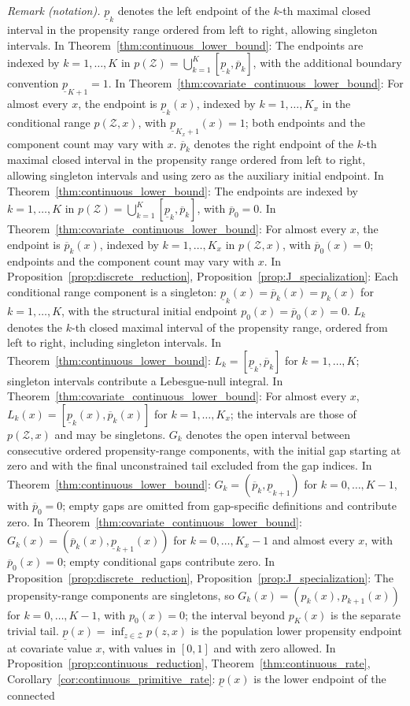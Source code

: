 \noindent\textit{Remark (notation).} $\underline p_k$ denotes the left endpoint of the $k$-th maximal closed interval in the propensity range ordered from left to right, allowing singleton intervals. In Theorem~\ref{thm:continuous_lower_bound}: The endpoints are indexed by $k=1,\ldots,K$ in $p(\mathcal Z)=\bigcup_{k=1}^K[\underline p_k,\overline p_k]$, with the additional boundary convention $\underline p_{K+1}=1$. In Theorem~\ref{thm:covariate_continuous_lower_bound}: For almost every $x$, the endpoint is $\underline p_k(x)$, indexed by $k=1,\ldots,K_x$ in the conditional range $p(\mathcal Z,x)$, with $\underline p_{K_x+1}(x)=1$; both endpoints and the component count may vary with $x$. $\overline p_k$ denotes the right endpoint of the $k$-th maximal closed interval in the propensity range ordered from left to right, allowing singleton intervals and using zero as the auxiliary initial endpoint. In Theorem~\ref{thm:continuous_lower_bound}: The endpoints are indexed by $k=1,\ldots,K$ in $p(\mathcal Z)=\bigcup_{k=1}^K[\underline p_k,\overline p_k]$, with $\overline p_0=0$. In Theorem~\ref{thm:covariate_continuous_lower_bound}: For almost every $x$, the endpoint is $\overline p_k(x)$, indexed by $k=1,\ldots,K_x$ in $p(\mathcal Z,x)$, with $\overline p_0(x)=0$; endpoints and the component count may vary with $x$. In Proposition~\ref{prop:discrete_reduction}, Proposition~\ref{prop:J_specialization}: Each conditional range component is a singleton: $\underline p_k(x)=\overline p_k(x)=p_k(x)$ for $k=1,\ldots,K$, with the structural initial endpoint $p_0(x)=\overline p_0(x)=0$. $L_k$ denotes the $k$-th closed maximal interval of the propensity range, ordered from left to right, including singleton intervals. In Theorem~\ref{thm:continuous_lower_bound}: $L_k=[\underline p_k,\overline p_k]$ for $k=1,\ldots,K$; singleton intervals contribute a Lebesgue-null integral. In Theorem~\ref{thm:covariate_continuous_lower_bound}: For almost every $x$, $L_k(x)=[\underline p_k(x),\overline p_k(x)]$ for $k=1,\ldots,K_x$; the intervals are those of $p(\mathcal Z,x)$ and may be singletons. $G_k$ denotes the open interval between consecutive ordered propensity-range components, with the initial gap starting at zero and with the final unconstrained tail excluded from the gap indices. In Theorem~\ref{thm:continuous_lower_bound}: $G_k=(\overline p_k,\underline p_{k+1})$ for $k=0,\ldots,K-1$, with $\overline p_0=0$; empty gaps are omitted from gap-specific definitions and contribute zero. In Theorem~\ref{thm:covariate_continuous_lower_bound}: $G_k(x)=(\overline p_k(x),\underline p_{k+1}(x))$ for $k=0,\ldots,K_x-1$ and almost every $x$, with $\overline p_0(x)=0$; empty conditional gaps contribute zero. In Proposition~\ref{prop:discrete_reduction}, Proposition~\ref{prop:J_specialization}: The propensity-range components are singletons, so $G_k(x)=(p_k(x),p_{k+1}(x))$ for $k=0,\ldots,K-1$, with $p_0(x)=0$; the interval beyond $p_K(x)$ is the separate trivial tail. $\underline p(x)=\inf_{z\in\mathcal Z}p(z,x)$ is the population lower propensity endpoint at covariate value $x$, with values in $[0,1]$ and with zero allowed. In Proposition~\ref{prop:continuous_reduction}, Theorem~\ref{thm:continuous_rate}, Corollary~\ref{cor:continuous_primitive_rate}: $\underline p(x)$ is the lower endpoint of the connected 
